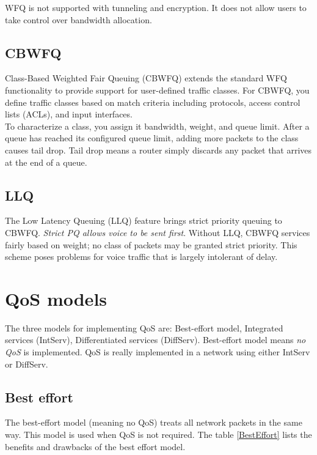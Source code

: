 WFQ is not supported with tunneling and encryption. It does not allow users to take control over bandwidth allocation.

\subsection{CBWFQ}

Class-Based Weighted Fair Queuing (CBWFQ) extends the standard WFQ functionality to provide support for user-defined traffic classes. For CBWFQ, you define traffic classes based on match criteria including protocols, access control lists (ACLs), and input interfaces.\\

To characterize a class, you assign it bandwidth, weight, and queue limit. After a queue has reached its configured queue limit, adding more packets to the class causes tail drop. Tail drop means a router simply discards any packet that arrives at the end of a queue.

\subsection{LLQ}

The Low Latency Queuing (LLQ) feature brings strict priority queuing to CBWFQ. \emph{Strict PQ allows voice to be sent first}. Without LLQ, CBWFQ services fairly based on weight; no class of packets may be granted strict priority. This scheme poses problems for voice traffic that is largely intolerant of delay.

\section{QoS models}
The three models for implementing QoS are: Best-effort model, Integrated services (IntServ), Differentiated services (DiffServ). Best-effort model means \emph{no QoS} is implemented. QoS is really implemented in a network using either IntServ or DiffServ.

\subsection{Best effort}

The best-effort model (meaning no QoS) treats all network packets in the same way. This model is used when QoS is not required. The table \ref{BestEffort} lists the benefits and drawbacks of the best effort model. 

